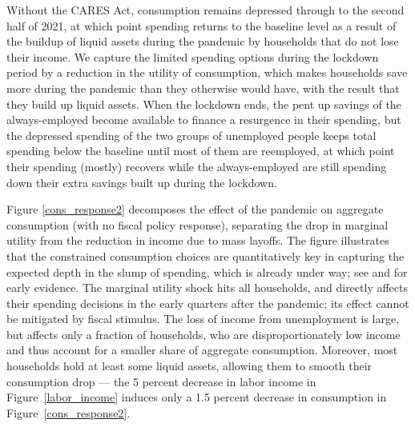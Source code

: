 \documentclass[titlepage,letterpaper]{\econtex}
\begin{document}
Without the CARES Act, consumption remains depressed through to the second half of 2021, at which point spending returns to the baseline level as a result of the buildup of liquid assets during the pandemic by households that do not lose their income.
We capture the limited spending options during the lockdown period by a reduction in the utility of consumption, which makes households save more during the pandemic than they otherwise would have, with the result that they build up liquid assets.
When the lockdown ends, the pent up savings of the always-employed become available to finance a resurgence in their spending, but the depressed spending of the two groups of unemployed people keeps total spending below the baseline until most of them are reemployed, at which point their spending (mostly) recovers while the always-employed are still spending down their extra savings built up during the lockdown.

Figure \ref{cons_response2} decomposes the effect of the pandemic on aggregate consumption (with no fiscal policy response), separating the drop in marginal utility from the reduction in income due to mass layoffs.
The figure illustrates that the constrained consumption choices are quantitatively key in capturing the expected depth in the slump of spending, which is already under way; see \cite{baker_Cpandemic} and \cite{nyFedCoronaBlog} for early evidence.
The marginal utility shock hits all households, and directly affects their spending decisions in the early quarters after the pandemic; its effect cannot be mitigated by fiscal stimulus.
The loss of income from unemployment is large, but affects only a fraction of households, who are disproportionately low income and thus account for a smaller share of aggregate consumption.
Moreover, most households hold at least some liquid assets, allowing them to smooth their consumption drop --- the 5 percent  decrease in labor income in Figure~\ref{labor_income} induces only a 1.5 percent decrease in consumption in Figure~\ref{cons_response2}.
\end{document}
